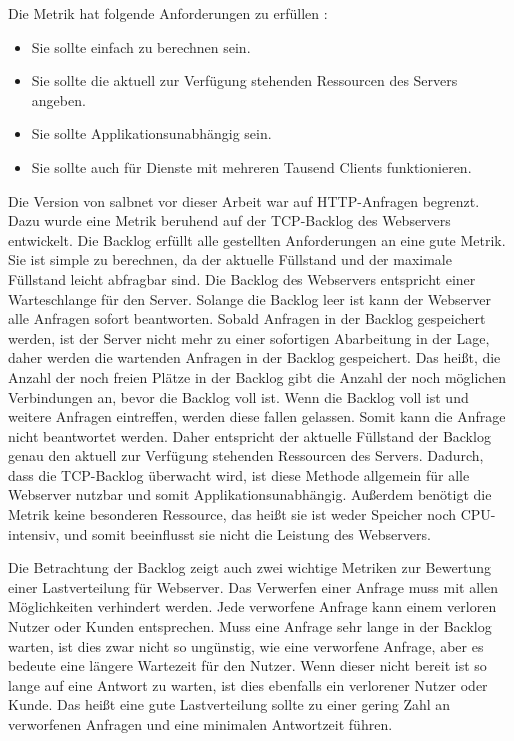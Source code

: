 \documentclass[a4paper, 12pt, BCOR10mm, DIV12, toc=bibliography, toc=listof, german]{scrbook}
\begin{document}
	Die Metrik hat folgende Anforderungen zu erfüllen \cite{scsczile2008}:

	\begin{itemize}
		\item Sie sollte einfach zu berechnen sein.
		\item Sie sollte die aktuell zur Verfügung stehenden Ressourcen des Servers angeben.
		\item Sie sollte Applikationsunabhängig sein.
		\item Sie sollte auch für Dienste mit mehreren Tausend Clients funktionieren.
	\end{itemize}
	
	Die Version von salbnet vor dieser Arbeit war auf HTTP-Anfragen begrenzt. Dazu wurde eine Metrik
	beruhend auf der TCP-Backlog des Webservers entwickelt. Die Backlog erfüllt alle gestellten
	Anforderungen an eine gute Metrik. Sie ist simple zu berechnen, da der aktuelle Füllstand und der
	maximale Füllstand leicht abfragbar sind. Die Backlog des Webservers entspricht einer
	Warteschlange für den Server. Solange die Backlog leer ist kann der Webserver alle Anfragen sofort
	beantworten.  Sobald Anfragen in der Backlog gespeichert werden, ist der Server nicht mehr zu
	einer sofortigen Abarbeitung in der Lage, daher werden die wartenden Anfragen in der Backlog
	gespeichert. Das heißt, die Anzahl der noch freien Plätze in der Backlog gibt die Anzahl der noch
	möglichen Verbindungen an, bevor die Backlog voll ist. Wenn die Backlog voll ist und weitere
	Anfragen eintreffen, werden diese fallen gelassen. Somit kann die Anfrage nicht beantwortet
	werden.  Daher entspricht der aktuelle Füllstand der Backlog genau den aktuell zur Verfügung
	stehenden Ressourcen des Servers. Dadurch, dass die TCP-Backlog überwacht wird, ist diese Methode
	allgemein für alle Webserver nutzbar und somit Applikationsunabhängig. Außerdem benötigt die
	Metrik keine besonderen Ressource, das heißt sie ist weder Speicher noch CPU-intensiv, und somit
	beeinflusst sie nicht die Leistung des Webservers. 

	Die Betrachtung der Backlog zeigt auch zwei wichtige Metriken zur Bewertung einer Lastverteilung
	für Webserver. Das Verwerfen einer Anfrage muss mit allen Möglichkeiten verhindert werden. Jede
	verworfene Anfrage kann einem verloren Nutzer oder Kunden entsprechen. Muss eine Anfrage sehr
	lange in der Backlog warten, ist dies zwar nicht so ungünstig, wie eine verworfene Anfrage, aber es
	bedeute eine längere Wartezeit für den Nutzer. Wenn dieser nicht bereit ist so lange auf eine
	Antwort zu warten, ist dies ebenfalls ein verlorener Nutzer oder Kunde. Das heißt eine gute
	Lastverteilung sollte zu einer gering Zahl an verworfenen Anfragen und eine minimalen Antwortzeit
	führen.
\end{document}
